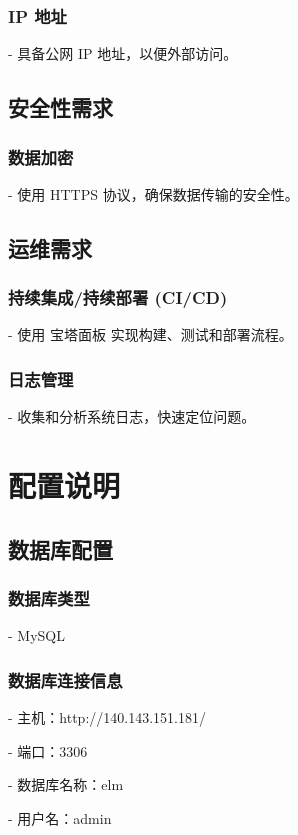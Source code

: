 \subsubsection{IP 地址}
- 具备公网 IP 地址，以便外部访问。

\subsection{安全性需求}
\subsubsection{数据加密}
- 使用 HTTPS 协议，确保数据传输的安全性。

\subsection{运维需求}

\subsubsection{持续集成/持续部署 (CI/CD)}
- 使用 宝塔面板 实现构建、测试和部署流程。

\subsubsection{日志管理}
- 收集和分析系统日志，快速定位问题。


\section{配置说明}

\subsection{数据库配置}

\subsubsection{数据库类型}
- MySQL

\subsubsection{数据库连接信息}
- 主机：http://140.143.151.181/

- 端口：3306

- 数据库名称：elm

- 用户名：admin

